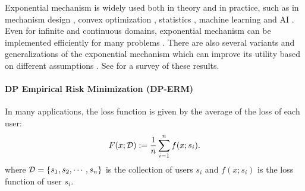  Exponential mechanism is widely used both in theory and in practice, such as in mechanism design \cite{HK12}, convex optimization \cite{BST14,MV21}, statistics \cite{WZ10,WM10,AKR+19}, machine learning and AI \cite{ZP19}. Even for infinite and continuous domains, exponential mechanism can be implemented efficiently for many problems \cite{HT10,CSS13,KT13,BV19,CKS20}. There are also several variants and generalizations of the exponential mechanism which can improve its utility based on different assumptions \cite{TS13,BNS13,RS16,LT19}. See \cite{LT19} for a survey of these results.
 
 
 
 
 
 
 
 
 
 
 \paragraph{DP Empirical Risk Minimization (DP-ERM)}
 In many applications, the loss function is given by the average of the loss of each user:
   \begin{align}
\label{eq:DPERM}
    F(x;\mathcal D):=\frac{1}{n}\sum_{i=1}^n f(x; s_i).
\end{align} 
 where $\mathcal D = \{s_1,s_2,\cdots,s_n\}$ is the collection of users $s_i$ and $f(x; s_i)$ is the loss function of user $s_i$. 
 
